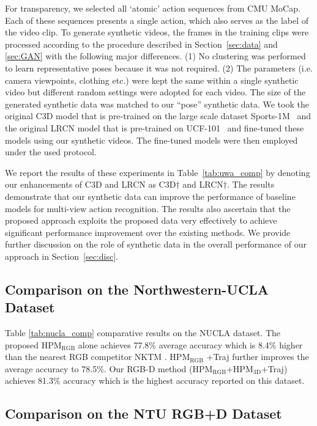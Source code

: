 \documentclass[twocolumn]{svjour3}          \smartqed  \usepackage{graphicx}
\begin{document}
For transparency, we  selected all `atomic' action sequences from CMU MoCap. Each of these sequences presents a single action, which also serves as the label of the video clip. To generate  synthetic videos, the frames in the training clips were processed according to the procedure described in Section~\ref{sec:data} and \ref{sec:GAN} with the following major differences. (1) No clustering was performed to learn representative poses because it was not required. (2) The parameters (i.e.  camera viewpoints, clothing etc.) were kept the same within a single synthetic video but  different  random settings were  adopted for each  video.  The size of the generated synthetic data  was matched to our ``pose''  synthetic data.  We took the  original C3D model that is pre-trained on the large scale dataset Sports-1M~\citep{karpathy2014large} and the original LRCN model that is pre-trained on UCF-101~\citep{soomro2012ucf101} and fine-tuned these models using our synthetic videos.  The fine-tuned models were then employed under the used protocol.

We report the results of these experiments in Table~\ref{tab:uwa_comp} by denoting our enhancements of C3D and LRCN as C3D$\dagger$ and LRCN$\dagger$. The results demonstrate that our synthetic data can improve the performance of baseline models for multi-view action recognition. The results also ascertain that  the proposed approach exploits the proposed data very effectively to achieve significant performance improvement over the existing methods.  We provide further discussion on the role of synthetic data in the overall performance of our approach in Section~\ref{sec:disc}.

\subsection{Comparison on the Northwestern-UCLA Dataset}
\label{sec:NUCLA}

Table \ref{tab:nucla_comp} comparative results on the NUCLA dataset. The proposed HPM$_{\mathrm{RGB}}$ alone achieves 77.8\% average accuracy which is 8.4\% higher than the nearest RGB competitor NKTM \citep{NKTM}. HPM$_{\mathrm{RGB}}$ +Traj further improves the average accuracy to 78.5\%. Our RGB-D method (HPM$_{\mathrm{RGB}}$+HPM$_{\mathrm{3D}}$+Traj) achieves 81.3\% accuracy which is the highest accuracy reported on this dataset.

\subsection{Comparison on the NTU RGB+D Dataset}
\end{document}
